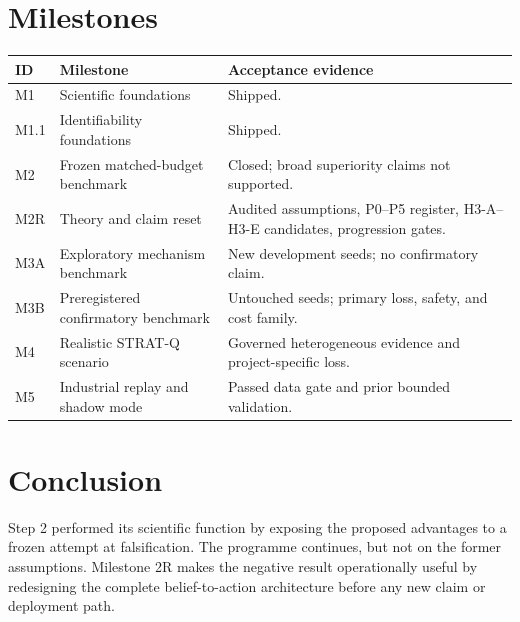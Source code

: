 \documentclass[11pt,a4paper]{report}
\begin{document}
\chapter{Milestones}

\begin{longtable}{p{}p{}p{}}
\toprule
ID & Milestone & Acceptance evidence \\
\midrule
M1 & Scientific foundations & Shipped. \\
M1.1 & Identifiability foundations & Shipped. \\
M2 & Frozen matched-budget benchmark & Closed; broad superiority claims not supported. \\
M2R & Theory and claim reset & Audited assumptions, P0--P5 register, H3-A--H3-E candidates, progression gates. \\
M3A & Exploratory mechanism benchmark & New development seeds; no confirmatory claim. \\
M3B & Preregistered confirmatory benchmark & Untouched seeds; primary loss, safety, and cost family. \\
M4 & Realistic STRAT-Q scenario & Governed heterogeneous evidence and project-specific loss. \\
M5 & Industrial replay and shadow mode & Passed data gate and prior bounded validation. \\
\bottomrule
\end{longtable}

\chapter{Conclusion}

Step 2 performed its scientific function by exposing the proposed advantages to a frozen attempt at falsification. The programme continues, but not on the former assumptions. Milestone 2R makes the negative result operationally useful by redesigning the complete belief-to-action architecture before any new claim or deployment path.
\end{document}

